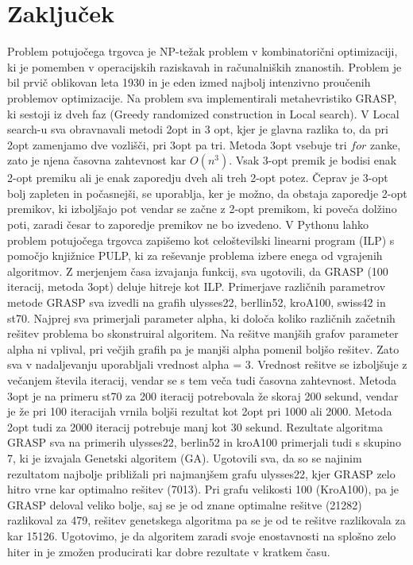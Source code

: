 \documentclass[12pt,a4paper]{amsart}
\theoremstyle{definition} %
\theoremstyle{plain} %
\begin{document}
\section{Zaključek}

Problem potujočega trgovca je NP-težak problem v kombinatorični optimizaciji, ki je pomemben v operacijskih raziskavah in računalniških znanostih.  Problem je bil prvič oblikovan leta 1930 in je eden izmed najbolj intenzivno proučenih problemov optimizacije. Na problem sva implementirali metahevristiko GRASP, ki sestoji iz dveh faz (Greedy randomized construction in Local search). V Local search-u sva obravnavali metodi 2opt in 3 opt, kjer je glavna razlika to, da pri 2opt zamenjamo dve vozlišči, pri 3opt pa tri. Metoda 3opt vsebuje tri $for$ zanke, zato je njena časovna zahtevnost kar $O(n^3)$. Vsak 3-opt premik je bodisi enak 2-opt premiku ali je enak zaporedju dveh ali treh 2-opt potez. Čeprav je 3-opt bolj zapleten in počasnejši, se uporablja, ker je možno, da obstaja zaporedje 2-opt premikov, ki izboljšajo pot vendar se začne z 2-opt premikom, ki poveča dolžino poti, zaradi česar to zaporedje premikov ne bo izvedeno.  V Pythonu lahko problem potujočega trgovca zapišemo kot celoštevilski linearni program (ILP) s pomočjo knjižnice PULP, ki za reševanje problema izbere enega od vgrajenih algoritmov. Z merjenjem časa izvajanja funkcij, sva ugotovili, da GRASP (100 iteracij, metoda 3opt) deluje hitreje kot ILP.  Primerjave različnih parametrov metode GRASP sva izvedli na grafih ulysses22, berllin52, kroA100, swiss42 in st70.  Najprej sva primerjali parameter alpha, ki določa koliko različnih začetnih rešitev problema bo skonstruiral algoritem. Na rešitve manjših grafov parameter alpha ni vplival, pri večjih grafih pa je manjši alpha pomenil boljšo rešitev. Zato sva v nadaljevanju uporabljali vrednost alpha = 3. Vrednost rešitve se izboljšuje z večanjem števila iteracij, vendar se s tem veča tudi časovna zahtevnost. Metoda 3opt je na primeru st70 za 200 iteracij potrebovala že skoraj 200 sekund, vendar je že pri 100 iteracijah vrnila boljši rezultat kot 2opt pri 1000 ali 2000. Metoda 2opt tudi za 2000 iteracij potrebuje manj kot 30 sekund. Rezultate algoritma GRASP sva na primerih ulysses22, berlin52 in kroA100 primerjali tudi s skupino 7, ki je izvajala Genetski algoritem (GA). Ugotovili sva, da so se najinim rezultatom najbolje približali pri najmanjšem grafu ulysses22, kjer GRASP zelo hitro vrne kar optimalno rešitev (7013). Pri grafu velikosti 100 (KroA100), pa je GRASP deloval veliko bolje, saj se je od znane optimalne rešitve (21282) razlikoval za 479, rešitev genetskega algoritma pa se je od te rešitve razlikovala za kar 15126. Ugotovimo, je da algoritem zaradi svoje enostavnosti na splošno zelo hiter in je zmožen producirati kar dobre rezultate v kratkem času. 
\end{document}
